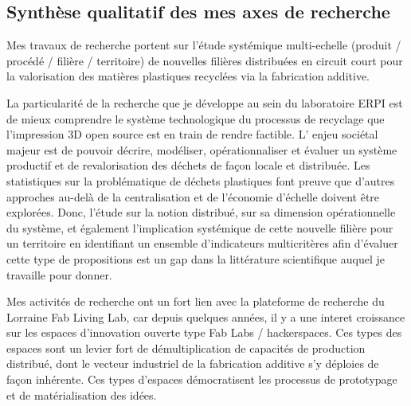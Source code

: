 \documentclass[
  11pt,
]{article}
\begin{document}
\hypertarget{synthuxe8se-qualitatif-des-mes-axes-de-recherche}{%
\subsection{Synthèse qualitatif des mes axes de
recherche}\label{synthuxe8se-qualitatif-des-mes-axes-de-recherche}}

\begin{tcolorbox}[enhanced jigsaw, titlerule=0mm, rightrule=.15mm, colframe=quarto-callout-tip-color-frame, coltitle=black, arc=.35mm, title=\textcolor{quarto-callout-tip-color}{\faLightbulb}\hspace{0.5em}{En quelque mots}, colbacktitle=quarto-callout-tip-color!10!white, breakable, opacityback=0, bottomrule=.15mm, opacitybacktitle=0.6, bottomtitle=1mm, left=2mm, toptitle=1mm, leftrule=.75mm, toprule=.15mm, colback=white]

Mes travaux de recherche portent sur l'étude systémique multi-echelle
(produit / procédé / filière / territoire) de nouvelles filières
distribuées en circuit court pour la valorisation des matières
plastiques recyclées via la fabrication additive.

\end{tcolorbox}

La particularité de la recherche que je développe au sein du laboratoire
ERPI est de mieux comprendre le système technologique du processus de
recyclage que l'impression 3D open source est en train de rendre
factible. L' enjeu sociétal majeur est de pouvoir décrire, modéliser,
opérationnaliser et évaluer un système productif et de revalorisation
des déchets de façon locale et distribuée. Les statistiques sur la
problématique de déchets plastiques font preuve que d'autres approches
au-delà de la centralisation et de l'économie d'échelle doivent être
explorées. Donc, l'étude sur la notion distribué, sur sa dimension
opérationnelle du système, et également l'implication systémique de
cette nouvelle filière pour un territoire en identifiant un ensemble
d'indicateurs multicritères afin d'évaluer cette type de propositions
est un gap dans la littérature scientifique auquel je travaille pour
donner.

Mes activités de recherche ont un fort lien avec la plateforme de
recherche du Lorraine Fab Living Lab, car depuis quelques années, il y a
une interet croissance sur les espaces d'innovation ouverte type Fab
Labs / hackerspaces. Ces types des espaces sont un levier fort de
démultiplication de capacités de production distribué, dont le vecteur
industriel de la fabrication additive s'y déploies de façon inhérente.
Ces types d'espaces démocratisent les processus de prototypage et de
matérialisation des idées.
\end{document}
